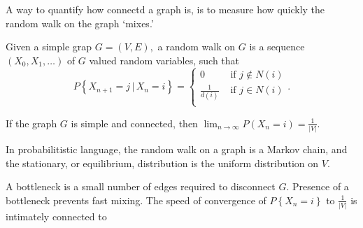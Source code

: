 

A way to quantify how connectd a graph is, is to measure how quickly the random walk on the graph `mixes.'
\begin{definition}
	Given a simple grap $G = (V,E),$ a random walk on $G$ is a sequence $(X_0, X_1, \dotsc)$ of $G$ valued random variables, such that
	$$P\left\{ X_{n+1} = j \, | \, X_n = i \right\} 
	= \begin{cases}
	0 & \text{ if } j \not \in N(i) \\
	\frac{1}{d(i)} & \text{ if } j \in N(i) \\
	\end{cases}.$$
\end{definition}
\begin{theorem}
	If the graph $G$ is simple and connected, then
	$ \lim_{n \to \infty} P(X_n = i) = \frac{1}{ \lvert V \rvert}.$
\end{theorem}
\begin{remark}
	In probabilitistic language, the random walk on a graph is a 
	Markov chain, and the stationary, or equilibrium, distribution
	is the uniform distribution on $V.$
\end{remark}
A bottleneck is a small number of edges required to disconnect $G.$
Presence of a bottleneck prevents fast mixing.
The speed of convergence of $P\left\{ X_n = i \right\}$ to $\frac{1}{ \lvert V \rvert}$ is intimately connected to 


\begin{figure}[h]
\centering
\end{figure}

